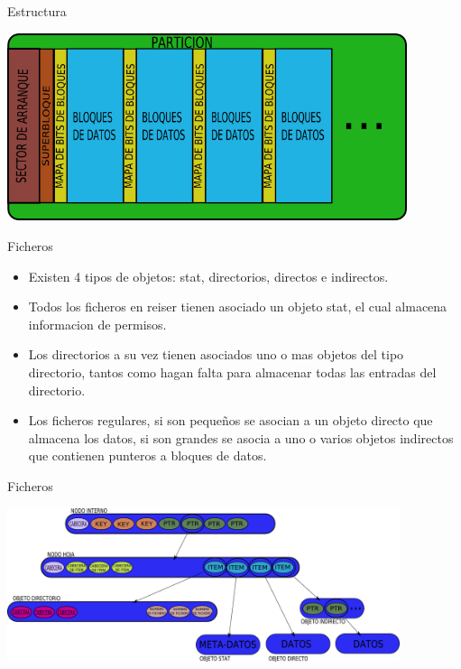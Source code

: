 \begin{frame}{Estructura}
  \begin{center}
    \includegraphics[height=5.5cm]{imgs/reiserfs_struct.png}
  \end{center}
\end{frame}

\begin{frame}{Ficheros}
  \begin{itemize}
    \item Existen 4 tipos de objetos: stat, directorios, directos e indirectos.
    \item Todos los ficheros en reiser tienen asociado un objeto stat, el cual almacena informacion de permisos.
    \item Los directorios a su vez tienen asociados uno o mas objetos del tipo directorio, tantos como hagan falta para almacenar todas las entradas del directorio.
    \item Los ficheros regulares, si son pequeños se asocian a un objeto directo que almacena los datos, si son grandes se asocia a uno o varios objetos indirectos que contienen punteros a bloques de datos.
  \end{itemize}
\end{frame}

\begin{frame}{Ficheros}
  \begin{center}
    \includegraphics[height=4.5cm]{imgs/reiserfs_files.png}
  \end{center}
\end{frame}
